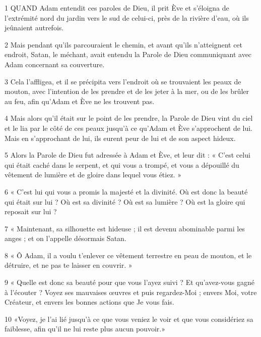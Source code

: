 \par 1 QUAND Adam entendit ces paroles de Dieu, il prit Ève et s'éloigna de l'extrémité nord du jardin vers le sud de celui-ci, près de la rivière d'eau, où ils jeûnaient autrefois.

\par 2 Mais pendant qu'ils parcouraient le chemin, et avant qu'ils n'atteignent cet endroit, Satan, le méchant, avait entendu la Parole de Dieu communiquant avec Adam concernant sa couverture.

\par 3 Cela l'affligea, et il se précipita vers l'endroit où se trouvaient les peaux de mouton, avec l'intention de les prendre et de les jeter à la mer, ou de les brûler au feu, afin qu'Adam et Ève ne les trouvent pas.

\par 4 Mais alors qu'il était sur le point de les prendre, la Parole de Dieu vint du ciel et le lia par le côté de ces peaux jusqu'à ce qu'Adam et Ève s'approchent de lui. Mais en s'approchant de lui, ils eurent peur de lui et de son aspect hideux.

\par 5 Alors la Parole de Dieu fut adressée à Adam et Ève, et leur dit : « C'est celui qui était caché dans le serpent, et qui vous a trompé, et vous a dépouillé du vêtement de lumière et de gloire dans lequel vous étiez. »

\par 6 « C'est lui qui vous a promis la majesté et la divinité. Où est donc la beauté qui était sur lui ? Où est sa divinité ? Où est sa lumière ? Où est la gloire qui reposait sur lui ?

\par 7 « Maintenant, sa silhouette est hideuse ; il est devenu abominable parmi les anges ; et on l’appelle désormais Satan.

\par 8 « Ô Adam, il a voulu t'enlever ce vêtement terrestre en peau de mouton, et le détruire, et ne pas te laisser en couvrir. »

\par 9 « Quelle est donc sa beauté pour que vous l'ayez suivi ? Et qu’avez-vous gagné à l’écouter ? Voyez ses mauvaises œuvres et puis regardez-Moi ; envers Moi, votre Créateur, et envers les bonnes actions que Je vous fais.

\par 10 «Voyez, je l'ai lié jusqu'à ce que vous veniez le voir et que vous considériez sa faiblesse, afin qu'il ne lui reste plus aucun pouvoir.»


